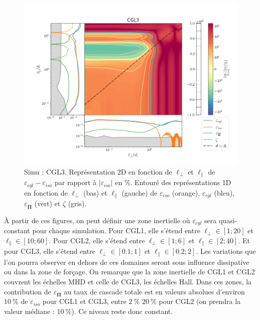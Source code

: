\begin{figure}[!ht]
 \centering
\includegraphics[width=0.95\linewidth,trim=1cm 1cm 0cm 2cm, clip=true]{./Part_3/images_ch3/CGL3_panel_isocgl_percent}
\cprotect\caption{Simu : CGL3. Représentation 2D en fonction de $\ell_{\perp}$ et $\ell_{\parallel}$ de $\varepsilon_{cgl}-\varepsilon_{iso}$ par rapport à $|\varepsilon_{iso}|$ en $\%$. Entouré des représentations 1D en fonction de $\ell_{\perp}$ (bas) et $\ell_{\parallel}$ (gauche) de $\varepsilon_{iso}$ (orange), $\varepsilon_{cgl}$ (bleu),  $\varepsilon_{\overline{\boldsymbol{\Pi}}} $ (vert) et $\zeta$ (gris).  }
\label{fig:trip_CGL3}
\end{figure}

À partir de ces figures, on peut définir une zone inertielle où $\varepsilon_{cgl}$ sera quasi-constant pour chaque simulation. Pour CGL1, elle s'étend entre $\ell_{\perp} \in [\num{1};\num{20}]$ et $\ell_{\parallel} \in [\num{10};\num{60}]$. Pour CGL2, elle s'étend entre $\ell_{\perp} \in [\num{1};\num{6}]$ et $\ell_{\parallel} \in [\num{2};\num{40}]$. Et pour CGL3, elle s'étend entre $\ell_{\perp} \in [\num{0.1};\num{1}]$ et $\ell_{\parallel} \in [\num{0.2};\num{2}]$. Les variations que l'on pourra observer en dehors de ces domaines seront sous influence dissipative ou dans la zone de forçage. On remarque que la zone inertielle de CGL1 et CGL2 couvrent les échelles \acs{MHD} et celle de CGL3, les échelles \acs{Hall}. Dans ces zones, la contribution de $\varepsilon_{\overline{\boldsymbol{\Pi}}}$ au taux de cascade totale est en valeurs absolues d'environ $\SI{10}{\%}$ de $\varepsilon_{iso}$ pour CGL1 et CGL3, entre $\SI{2}{\%}$ $\SI{20}{\%}$ pour CGL2 (on prendra la valeur médiane : $\SI{10}{\%}$). Ce niveau reste donc constant. 

